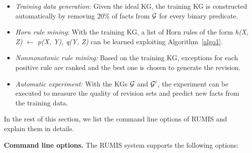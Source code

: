 \begin{itemize}
\item \textit{Training data generation:} Given the ideal KG, the training KG is constructed automatically by removing 20\% of facts from $\mathcal{G}$ for every binary predicate.
\item \textit{Horn rule mining:} With the training KG, a list of Horn rules of the form \textit{h(X, Z) $\leftarrow$ p(X, Y), q(Y, Z)} can be learned exploiting Algorithm~\ref{algo1}.
\item \textit{Nonmonotonic rule mining:} Based on the training KG, exceptions for each positive rule are ranked and the best one is chosen to generate the revision.
\item \textit{Automatic experiment:} With the KGs $\mathcal{G}$ and $\mathcal{G}^i$, the experiment can be executed to measure the quality of revision sets and predict new facts from the training data.
\end{itemize}

In the rest of this section, we list the command line options of RUMIS and explain them in details.

%
%
%

\textbf{Command line options.} The RUMIS system supports the following options:

